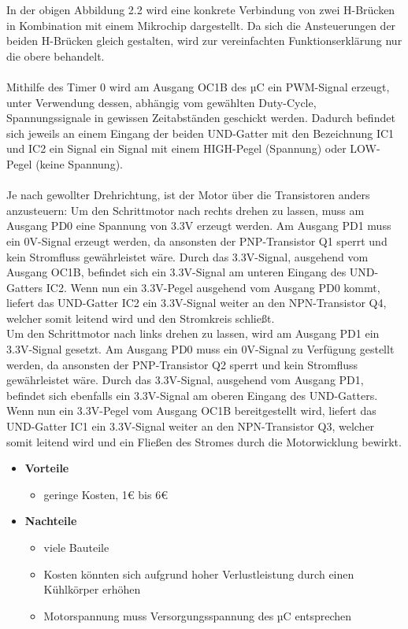 In der obigen Abbildung 2.2 wird eine konkrete Verbindung von zwei H-Brücken in Kombination mit einem Mikrochip dargestellt.
Da sich die Ansteuerungen der beiden H-Brücken gleich gestalten, wird zur vereinfachten Funktionserklärung nur die obere behandelt. \\\\
Mithilfe des Timer 0 wird am Ausgang OC1B des \acs{µC} ein PWM-Signal erzeugt, unter Verwendung dessen,
abhängig vom gewählten Duty-Cycle, Spannungssignale in gewissen Zeitabständen geschickt werden.
Dadurch befindet sich jeweils an einem Eingang der beiden UND-Gatter mit den Bezeichnung IC1 und IC2 ein Signal ein Signal mit einem HIGH-Pegel (Spannung) oder LOW-Pegel (keine Spannung). \\\\
Je nach gewollter Drehrichtung, ist der Motor über die Transistoren anders anzusteuern:
Um den Schrittmotor nach rechts drehen zu lassen, muss am Ausgang PD0 eine Spannung von 3.3V erzeugt werden.
Am Ausgang PD1 muss ein 0V-Signal erzeugt werden, da ansonsten der PNP-Transistor Q1 sperrt und kein Stromfluss gewährleistet wäre.
Durch das 3.3V-Signal, ausgehend vom Ausgang OC1B, befindet sich ein 3.3V-Signal am unteren Eingang des UND-Gatters IC2.
Wenn nun ein 3.3V-Pegel ausgehend vom Ausgang PD0 kommt, liefert das UND-Gatter IC2 ein 3.3V-Signal weiter an den NPN-Transistor Q4, welcher somit leitend wird und den Stromkreis schließt. \\
Um den Schrittmotor nach links drehen zu lassen, wird am Ausgang PD1 ein 3.3V-Signal gesetzt.
Am Ausgang PD0 muss ein 0V-Signal zu Verfügung gestellt werden, da ansonsten der PNP-Transistor Q2 sperrt und kein Stromfluss gewährleistet wäre.
Durch das 3.3V-Signal, ausgehend vom Ausgang PD1, befindet sich ebenfalls ein 3.3V-Signal am oberen Eingang des UND-Gatters.
Wenn nun ein 3.3V-Pegel vom Ausgang OC1B bereitgestellt wird, liefert das UND-Gatter IC1 ein 3.3V-Signal weiter an den NPN-Transistor Q3, welcher somit leitend wird und
ein Fließen des Stromes durch die Motorwicklung bewirkt.

\begin{itemize}
    \item \textbf{Vorteile}
    \begin{itemize}
        \item geringe Kosten, 1€ bis 6€
    \end{itemize}
    \item \textbf{Nachteile}
    \begin{itemize}
        \item viele Bauteile
        \item Kosten könnten sich aufgrund hoher Verlustleistung durch einen Kühlkörper erhöhen
        \item Motorspannung muss Versorgungsspannung des µC entsprechen
    \end{itemize}
\end{itemize}

